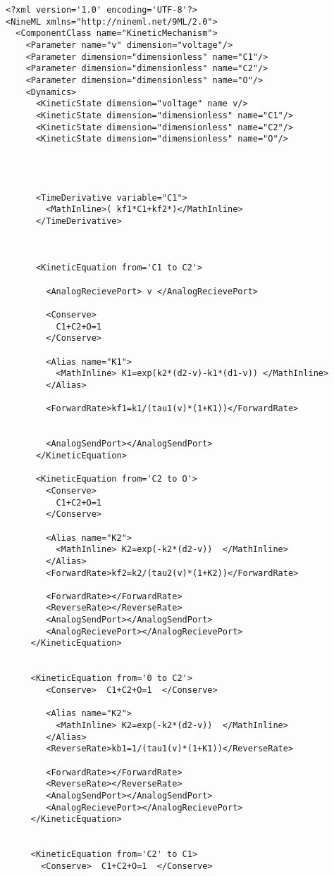 \documentclass[draftspec]{ninemlspec}
\begin{document}
\begin{lstlisting}[label=code:xmliaf2]
<?xml version='1.0' encoding='UTF-8'?>
<NineML xmlns="http://nineml.net/9ML/2.0">
  <ComponentClass name="KineticMechanism">
	<Parameter name="v" dimension="voltage"/>
    <Parameter dimension="dimensionless" name="C1"/>
    <Parameter dimension="dimensionless" name="C2"/>
    <Parameter dimension="dimensionless" name="O"/>
    <Dynamics>
      <KineticState dimension="voltage" name v/> 
      <KineticState dimension="dimensionless" name="C1"/>
      <KineticState dimension="dimensionless" name="C2"/>
      <KineticState dimension="dimensionless" name="O"/>




	  <TimeDerivative variable="C1">
	  	<MathInline>( kf1*C1+kf2*)</MathInline>
 	  </TimeDerivative>

    
	 
	  <KineticEquation from='C1 to C2'>
	 	
	 	<AnalogRecievePort> v </AnalogRecievePort>

	 	<Conserve> 
	 	  C1+C2+O=1  
	 	</Conserve>    
    	
    	<Alias name="K1">
	 	  <MathInline> K1=exp(k2*(d2-v)-k1*(d1-v)) </MathInline> 
  	    </Alias>

	  	<ForwardRate>kf1=k1/(tau1(v)*(1+K1))</ForwardRate>
		
		
		<AnalogSendPort></AnalogSendPort>
	  </KineticEquation>

	  <KineticEquation from='C2 to O'>
	  	<Conserve>  
	  	  C1+C2+O=1  
	  	</Conserve>
	  	
		<Alias name="K2">
	 	  <MathInline> K2=exp(-k2*(d2-v))  </MathInline>
	 	</Alias>
	 	<ForwardRate>kf2=k2/(tau2(v)*(1+K2))</ForwardRate>

	  	<ForwardRate></ForwardRate>
		<ReverseRate></ReverseRate>
		<AnalogSendPort></AnalogSendPort>
		<AnalogRecievePort></AnalogRecievePort>
	 </KineticEquation>


     <KineticEquation from='0 to C2'>
	  	<Conserve>  C1+C2+O=1  </Conserve>
	  	
		<Alias name="K2">
	 	  <MathInline> K2=exp(-k2*(d2-v))  </MathInline>
	 	</Alias>
		<ReverseRate>kb1=1/(tau1(v)*(1+K1))</ReverseRate>

	  	<ForwardRate></ForwardRate>
		<ReverseRate></ReverseRate>
		<AnalogSendPort></AnalogSendPort>
		<AnalogRecievePort></AnalogRecievePort>
	 </KineticEquation>


     <KineticEquation from='C2' to C1>
	   <Conserve>  C1+C2+O=1  </Conserve>
	  	

\end{lstlisting}
\end{document}
